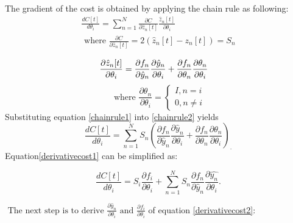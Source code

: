 The gradient of the cost is obtained by applying the chain rule as following:
\begin{equation} \label{chainrule1}
\begin{array}{c}

\frac{d C[t]}{d \theta_{i}}=\sum_{n=1}^{N} \frac{\partial C}{\partial \hat{z}_{n}[t]}  \frac{\hat{z}_{n}[t]}{\partial \theta_{i}} \\
\text { where } \frac{\partial C}{\partial \hat{z}_{n}[t]}=2(\hat{z}_n[t]-z_n[t]) = S_n
\end{array}
\end{equation}


\begin{equation} \label{chainrule2}
\frac{\partial \hat{z}_{n}[t]}{\partial \theta_{i}}=\frac{\partial f_{n}}{\partial \hat{y}_{n}}  \frac{\partial \hat{y}_{n}}{\partial \theta_{i}}+\frac{\partial f_{n}}{\partial \theta_{n}}  \frac{\partial \theta_{n}}{\partial \theta_{i}} \\
\quad 
\end{equation}
$$
\text { where } \frac{\partial \theta_{n}}{\partial \theta_{i}}=\left\{
\begin{array}{l}
I, n = i \\
0, n  \neq i
\end{array}\right.
$$
Substituting equation \eqref{chainrule1} into \eqref{chainrule2} yields
\begin{equation} \label{derivativecost1}
\frac{d C[t]}{d \theta_{i}}=\sum_{n=1}^{N} S_{n}\left(\frac{\partial f_{n}}{\partial \hat{y}_{n}}  \frac{\partial \hat{y}_{n}}{\partial \theta_{i}}+\frac{\partial f_{n}}{\partial \theta_{n}}  \frac{\partial \theta_{n}}{\partial \theta_{i}}\right)_\cdot
\end{equation}
Equation\eqref{derivativecost1} can be simplified as:

\begin{equation} \label{derivativecost2}
    \frac{d C[t]}{d \theta_{i}}
    =
    S_{i}
    \frac{\partial f_{i}}{\partial \theta_{i}}
    +\sum_{n=1}^{N} S_{n}\frac{\partial f_{n}}{\partial \hat{y}_{n}}  \frac{\partial \hat{y_n}}{\partial \theta_{i}}.
\end{equation}


$\text { The next step is to derive } \frac{\partial \hat{y}_{n}}{\partial \theta_{i}} \text { and } \frac{\partial f_{i}}{\partial \theta_{i}}$ of  equation \eqref{derivativecost2}:


